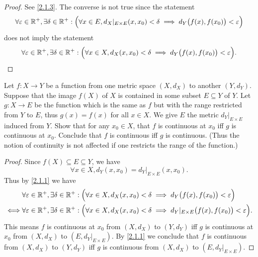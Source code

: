 \begin{proof}
  See \cref{2.1.3}.
  The converse is not true since the statement
  \[
    \forall \varepsilon \in \mathbb{R}^+, \exists \delta \in \mathbb{R}^+ : \Big(\forall x \in E, d_X|_{E \times E}(x, x_0) < \delta \implies d_Y\big(f(x), f(x_0)\big) < \varepsilon\Big)
  \]
  does not imply the statement
  \[
    \forall \varepsilon \in \mathbb{R}^+, \exists \delta \in \mathbb{R}^+ : \Big(\forall x \in X, d_X(x, x_0) < \delta \implies d_Y\big(f(x), f(x_0)\big) < \varepsilon\Big).
  \]
\end{proof}

\begin{ex}\label{ex:2.1.7}
  Let \(f : X \to Y\) be a function from one metric space \((X, d_X)\) to another \((Y, d_Y)\).
  Suppose that the image \(f(X)\) of \(X\) is contained in some subset \(E \subseteq Y\) of \(Y\).
  Let \(g : X \to E\) be the function which is the same as \(f\) but with the range restricted from \(Y\) to \(E\), thus \(g(x) = f(x)\) for all \(x \in X\).
  We give \(E\) the metric \(d_Y|_{E \times E}\) induced from \(Y\).
  Show that for any \(x_0 \in X\), that \(f\) is continuous at \(x_0\) iff \(g\) is continuous at \(x_0\).
  Conclude that \(f\) is continuous iff \(g\) is continuous.
  (Thus the notion of continuity is not affected if one restricts the range of the function.)
\end{ex}

\begin{proof}
  Since \(f(X) \subseteq E \subseteq Y\), we have
  \[
    \forall x \in X, d_Y(x, x_0) = d_Y|_{E \times E}(x, x_0).
  \]
  Thus by \cref{2.1.1} we have
  \begin{align*}
         & \forall \varepsilon \in \mathbb{R}^+, \exists \delta \in \mathbb{R}^+ : \Big(\forall x \in X, d_X(x, x_0) < \delta \implies d_Y\big(f(x), f(x_0)\big) < \varepsilon\Big)                \\
    \iff & \forall \varepsilon \in \mathbb{R}^+, \exists \delta \in \mathbb{R}^+ : \Big(\forall x \in X, d_X(x, x_0) < \delta \implies d_Y|_{E \times E}\big(f(x), f(x_0)\big) < \varepsilon\Big).
  \end{align*}
  This means \(f\) is continuous at \(x_0\) from \((X, d_X)\) to \((Y, d_Y)\) iff \(g\) is continuous at \(x_0\) from \((X, d_X)\) to \((E, d_Y|_{E \times E})\).
  By \cref{2.1.1} we conclude that \(f\) is continuous from \((X, d_X)\) to \((Y, d_Y)\) iff \(g\) is continuous from \((X, d_X)\) to \((E, d_Y|_{E \times E})\).
\end{proof}